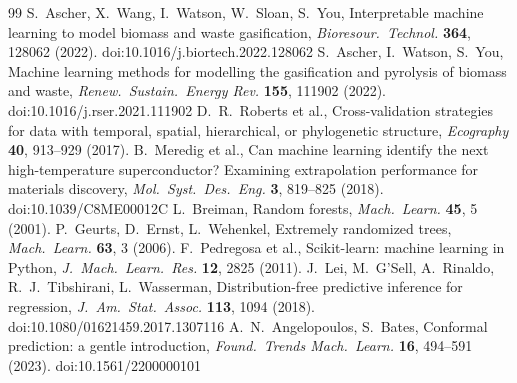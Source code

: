\documentclass[11pt,a4paper]{article}
\begin{document}
\begin{thebibliography}{99}\small
{} S.~Ascher, X.~Wang, I.~Watson, W.~Sloan, S.~You, Interpretable machine learning to model biomass and waste gasification, \emph{Bioresour.\ Technol.} \textbf{364}, 128062 (2022). doi:10.1016/j.biortech.2022.128062
 S.~Ascher, I.~Watson, S.~You, Machine learning methods for modelling the gasification and pyrolysis of biomass and waste, \emph{Renew.\ Sustain.\ Energy Rev.} \textbf{155}, 111902 (2022). doi:10.1016/j.rser.2021.111902
 D.~R.~Roberts et al., Cross-validation strategies for data with temporal, spatial, hierarchical, or phylogenetic structure, \emph{Ecography} \textbf{40}, 913--929 (2017).
 B.~Meredig et al., Can machine learning identify the next high-temperature superconductor? Examining extrapolation performance for materials discovery, \emph{Mol.\ Syst.\ Des.\ Eng.} \textbf{3}, 819--825 (2018). doi:10.1039/C8ME00012C
 L.~Breiman, Random forests, \emph{Mach.\ Learn.} \textbf{45}, 5 (2001).
 P.~Geurts, D.~Ernst, L.~Wehenkel, Extremely randomized trees, \emph{Mach.\ Learn.} \textbf{63}, 3 (2006).
 F.~Pedregosa et al., Scikit-learn: machine learning in Python, \emph{J.\ Mach.\ Learn.\ Res.} \textbf{12}, 2825 (2011).
 J.~Lei, M.~G'Sell, A.~Rinaldo, R.~J.~Tibshirani, L.~Wasserman, Distribution-free predictive inference for regression, \emph{J.\ Am.\ Stat.\ Assoc.} \textbf{113}, 1094 (2018). doi:10.1080/01621459.2017.1307116
 A.~N.~Angelopoulos, S.~Bates, Conformal prediction: a gentle introduction, \emph{Found.\ Trends Mach.\ Learn.} \textbf{16}, 494--591 (2023). doi:10.1561/2200000101
\end{thebibliography}
\end{document}
